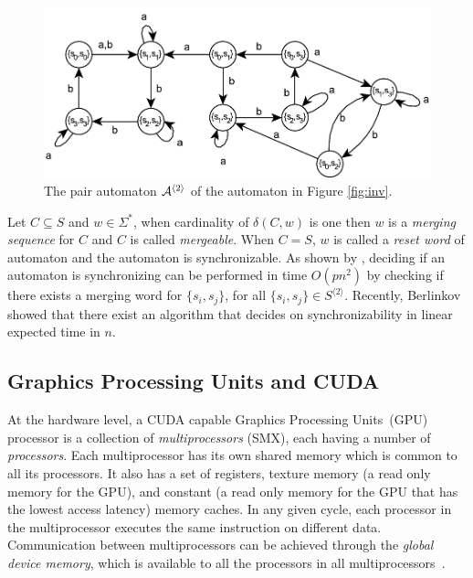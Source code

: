 \documentclass[12pt]{article}
\newcommand{\kkcomm}[1]{{\color{red}{\bf kk: #1}}}
\begin{document}
\begin{figure}[ht]
	\centering
	\includegraphics[width=\textwidth]{figs/pair.pdf}
	\caption{The pair automaton ${\cal A}^{\langle 2 \rangle}$ of the automaton in Figure \ref{fig:inv}.}
	\label{fig:pair}
\end{figure}

Let $C \subseteq S$ and $w \in \Sigma^*$, when cardinality of $\delta(C,w)$ is one then $w$ is a \textit{merging sequence} for $C$ and $C$ is called \textit{mergeable}. When $C=S$, $w$ is called a \textit{reset word} of automaton and the automaton is synchronizable. As shown by \cite{Eppstein90}, deciding if an automaton is synchronizing can be performed in time $O(pn^2)$ by checking if there exists a merging word for $\{ s_i, s_j \}$, for all  $\{ s_i, s_j \} \in S^{\langle 2 \rangle}$. 
Recently, Berlinkov \cite{Berlinkov2016} showed that there exist an algorithm that decides on synchronizability in linear expected time in $n$. 

\kkcomm{define Cerny automata here}

\subsection{Graphics Processing Units and CUDA}\label{sec:gpu}

At the hardware level, a CUDA capable Graphics Processing Units~(GPU) processor is a collection of
\textit{multiprocessors} (SMX), each having a number of
\textit{processors}.  Each multiprocessor has its own shared memory
which is common to all its processors.  It also has a set of
registers, texture memory (a read only memory for the GPU), and
constant (a read only memory for the GPU that has the lowest access
latency) memory caches.  In any given cycle, each processor in the
multiprocessor executes the same instruction on different data.
Communication between multiprocessors can be achieved through the
\textit{global device memory}, which is available to all the
processors in all multiprocessors~\cite{nvidia}.
\end{document}
